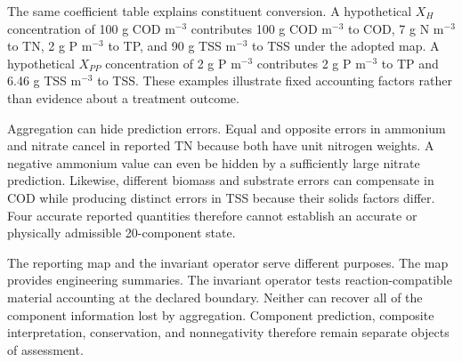The same coefficient table explains constituent conversion. A hypothetical $X_H$ concentration of 100 g COD m$^{-3}$ contributes 100 g COD m$^{-3}$ to COD, 7 g N m$^{-3}$ to TN, 2 g P m$^{-3}$ to TP, and 90 g TSS m$^{-3}$ to TSS under the adopted map. A hypothetical $X_{PP}$ concentration of 2 g P m$^{-3}$ contributes 2 g P m$^{-3}$ to TP and 6.46 g TSS m$^{-3}$ to TSS. These examples illustrate fixed accounting factors rather than evidence about a treatment outcome.

Aggregation can hide prediction errors. Equal and opposite errors in ammonium and nitrate cancel in reported TN because both have unit nitrogen weights. A negative ammonium value can even be hidden by a sufficiently large nitrate prediction. Likewise, different biomass and substrate errors can compensate in COD while producing distinct errors in TSS because their solids factors differ. Four accurate reported quantities therefore cannot establish an accurate or physically admissible 20-component state.

The reporting map and the invariant operator serve different purposes. The map provides engineering summaries. The invariant operator tests reaction-compatible material accounting at the declared boundary. Neither can recover all of the component information lost by aggregation. Component prediction, composite interpretation, conservation, and nonnegativity therefore remain separate objects of assessment.
